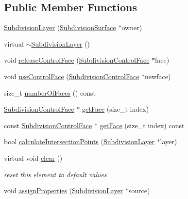 \subsection*{Public Member Functions}
\begin{DoxyCompactItemize}
\item 
\hyperlink{classShipCAD_1_1SubdivisionLayer_a788864a40265b764b8d97d9a9cbbbd13}{Subdivision\+Layer} (\hyperlink{classShipCAD_1_1SubdivisionSurface}{Subdivision\+Surface} $\ast$owner)
\item 
virtual \hyperlink{classShipCAD_1_1SubdivisionLayer_a4e852a07f46e57f28ffedd4a68c2f4c4}{$\sim$\+Subdivision\+Layer} ()
\item 
void \hyperlink{classShipCAD_1_1SubdivisionLayer_a234cb1ed2e4a4fceb4c7701d0a56f42e}{release\+Control\+Face} (\hyperlink{classShipCAD_1_1SubdivisionControlFace}{Subdivision\+Control\+Face} $\ast$face)
\item 
void \hyperlink{classShipCAD_1_1SubdivisionLayer_a4a4190cc8ce19c975af865d1ce435f39}{use\+Control\+Face} (\hyperlink{classShipCAD_1_1SubdivisionControlFace}{Subdivision\+Control\+Face} $\ast$newface)
\item 
size\+\_\+t \hyperlink{classShipCAD_1_1SubdivisionLayer_ad0d77de06b53814e248fc9bbfa908252}{number\+Of\+Faces} () const 
\item 
\hyperlink{classShipCAD_1_1SubdivisionControlFace}{Subdivision\+Control\+Face} $\ast$ \hyperlink{classShipCAD_1_1SubdivisionLayer_a2e1538a000268fe5f56bf2bea4973c23}{get\+Face} (size\+\_\+t index)
\item 
const \hyperlink{classShipCAD_1_1SubdivisionControlFace}{Subdivision\+Control\+Face} $\ast$ \hyperlink{classShipCAD_1_1SubdivisionLayer_a13a971f70ac8907ecaa0c083b98519e0}{get\+Face} (size\+\_\+t index) const 
\item 
bool \hyperlink{classShipCAD_1_1SubdivisionLayer_ab2d11ebf60ad6edd818eb0c42971946c}{calculate\+Intersection\+Points} (\hyperlink{classShipCAD_1_1SubdivisionLayer}{Subdivision\+Layer} $\ast$layer)
\item 
virtual void \hyperlink{classShipCAD_1_1SubdivisionLayer_a7046d17ba87dd5ce7399f22ae327fc6e}{clear} ()
\begin{DoxyCompactList}\small\item\em reset this element to default values \end{DoxyCompactList}\item 
void \hyperlink{classShipCAD_1_1SubdivisionLayer_a319ae070f596e92307671cda0a607887}{assign\+Properties} (\hyperlink{classShipCAD_1_1SubdivisionLayer}{Subdivision\+Layer} $\ast$source)

\end{DoxyCompactItemize}
